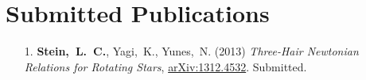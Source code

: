 
\section{\sc Submitted Publications}
\begin{enumerate}
\item[{1.}] {\bf Stein,~L.~C.}, Yagi,~K., Yunes,~N. (2013)
  {\it Three-Hair Newtonian Relations for Rotating Stars},
  \href{http://arxiv.org/abs/1312.4532}{arXiv:1312.4532}. Submitted.
\end{enumerate}


